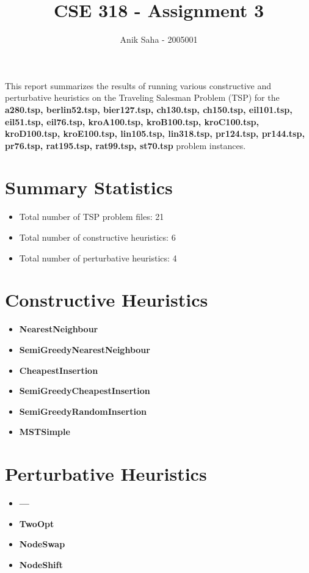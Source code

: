 \documentclass{article}
\title{CSE 318 - Assignment 3}
\author{Anik Saha - 2005001}
\begin{document}
\maketitle

This report summarizes the results of running various constructive and perturbative heuristics on the Traveling Salesman Problem (TSP) for the \textbf{a280.tsp, berlin52.tsp, bier127.tsp, ch130.tsp, ch150.tsp, eil101.tsp, eil51.tsp, eil76.tsp, kroA100.tsp, kroB100.tsp, kroC100.tsp, kroD100.tsp, kroE100.tsp, lin105.tsp, lin318.tsp, pr124.tsp, pr144.tsp, pr76.tsp, rat195.tsp, rat99.tsp, st70.tsp} problem instances.

\section*{Summary Statistics}
\begin{itemize}
  \item Total number of TSP problem files: 21
  \item Total number of constructive heuristics: 6
  \item Total number of perturbative heuristics: 4
\end{itemize}

\section*{Constructive Heuristics}
\begin{itemize}
    \item \textbf{NearestNeighbour}
    \item \textbf{SemiGreedyNearestNeighbour}
    \item \textbf{CheapestInsertion}
    \item \textbf{SemiGreedyCheapestInsertion}
    \item \textbf{SemiGreedyRandomInsertion}
    \item \textbf{MSTSimple}

\end{itemize}

\section*{Perturbative Heuristics}
\begin{itemize}
    \item \textbf{---}
    \item \textbf{TwoOpt}
    \item \textbf{NodeSwap}
    \item \textbf{NodeShift}

\end{itemize}
\end{document}

